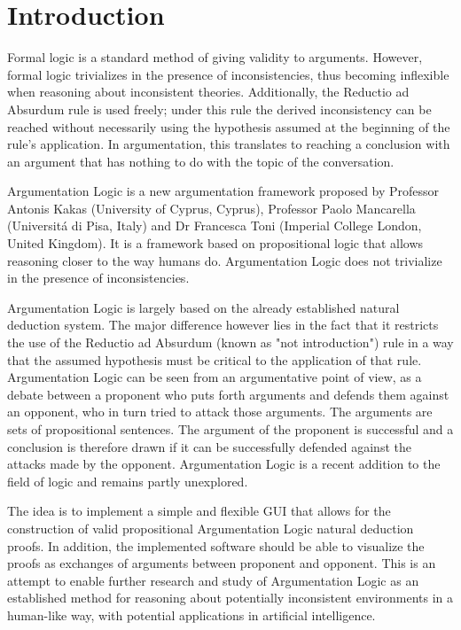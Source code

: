 \documentclass[11pt,twoside,a4paper]{report}
\begin{document}
\chapter{Introduction}

Formal logic is a standard method of giving validity to arguments. However, formal logic trivializes in the presence of inconsistencies, thus becoming inflexible when reasoning about inconsistent theories. Additionally, the Reductio ad Absurdum rule is used freely; under this rule the derived inconsistency can be reached without necessarily using the hypothesis assumed at the beginning of the rule's application. In argumentation, this translates to reaching a conclusion with an argument that has nothing to do with the topic of the conversation.

Argumentation Logic is a new argumentation framework proposed by Professor Antonis Kakas (University of Cyprus, Cyprus), Professor Paolo Mancarella (Universit\'a di Pisa, Italy) and Dr Francesca Toni (Imperial College London, United Kingdom). It is a framework based on propositional logic that allows reasoning closer to the way humans do. Argumentation Logic does not trivialize in the presence of inconsistencies.

Argumentation Logic is largely based on the already established natural deduction system. The major difference however lies in the fact that it restricts the use of the Reductio ad Absurdum (known as "not introduction") rule in a way that the assumed hypothesis must be critical to the application of that rule. Argumentation Logic can be seen from an argumentative point of view, as a debate between a proponent who puts forth arguments and defends them against an opponent, who in turn tried to attack those arguments. The arguments are sets of propositional sentences. The argument of the proponent is successful and a conclusion is therefore drawn if it can be successfully defended against the attacks made by the opponent. Argumentation Logic is a recent addition to the field of logic and remains partly unexplored.

The idea is to implement a simple and flexible GUI that allows for the construction of valid propositional Argumentation Logic natural deduction proofs. In addition, the implemented software should be able to visualize the proofs as exchanges of arguments between proponent and opponent. This is an attempt to enable further research and study of Argumentation Logic as an established method for reasoning about potentially inconsistent environments in a human-like way, with potential applications in artificial intelligence.
\end{document}
